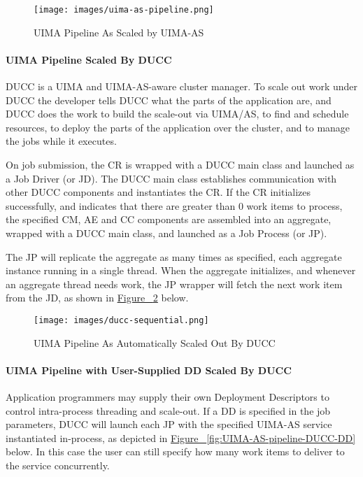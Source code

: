     \begin{figure}[H]
      \centering
      \texttt{[image: images/uima-as-pipeline.png]}
      \caption{UIMA Pipeline As Scaled by UIMA-AS}
      \label{fig:UIMA-AS-pipeline}
    \end{figure}

    \paragraph{UIMA Pipeline Scaled By DUCC}
    DUCC is a UIMA and  UIMA-AS-aware cluster manager.  To scale out work under DUCC the developer
    tells DUCC what the parts of the application are, and DUCC does the work to build the
    scale-out via UIMA/AS, to find and schedule resources, to deploy the parts of the application
    over the cluster, and to manage the jobs while it executes.

    On job submission, the CR is wrapped with a DUCC main class and launched as a Job Driver (or JD).
    The DUCC main class establishes communication with other DUCC components and instantiates the CR.
    If the CR initializes successfully, and indicates that there are greater than 0 work items to process,
    the specified CM, AE and CC components are assembled into an aggregate, wrapped with a DUCC main
    class, and launched as a Job Process (or JP).

	The JP will replicate the aggregate as many times as specified, each aggregate instance running 
	in a single thread. When the aggregate initializes, and whenever an aggregate thread needs work,
	the JP wrapper will fetch the next work item from the JD, as shown in 
    \hyperref[fig:UIMA-AS-pipeline-DUCC]{Figure ~\ref{fig:UIMA-AS-pipeline-DUCC}} below.

    \begin{figure}[H]
      \centering
      \texttt{[image: images/ducc-sequential.png]}
      \caption{UIMA Pipeline As Automatically Scaled Out By DUCC}
      \label{fig:UIMA-AS-pipeline-DUCC}
    \end{figure}

    \paragraph{UIMA Pipeline with User-Supplied DD Scaled By DUCC}

    Application programmers may supply their own Deployment Descriptors to control intra-process
    threading and scale-out.  If a DD is specified in the job parameters, DUCC will launch each
    JP with the specified UIMA-AS service instantiated in-process,
    as depicted in \hyperref[fig:UIMA-AS-pipeline-DUCC-DD]{Figure ~\ref{fig:UIMA-AS-pipeline-DUCC-DD}} below.
    In this case the user can still specify how many work items to deliver to the service concurrently.

